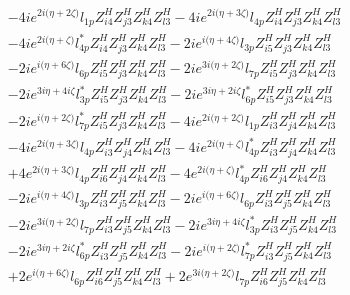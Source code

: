 \begin{align}
 &-4 i e^{2 i \Big(\eta +2 \zeta \Big)} l_{1p} Z_{{i 4}}^{H} Z_{{j 3}}^{H} Z_{{k 4}}^{H} Z_{{l 3}}^{H} -4 i e^{2 i \Big(\eta +3 \zeta \Big)} l_{4p} Z_{{i 4}}^{H} Z_{{j 3}}^{H} Z_{{k 4}}^{H} Z_{{l 3}}^{H} \nonumber \\ 
 &-4 i e^{2 i \Big(\eta +\zeta \Big)} l_{4p}^* Z_{{i 4}}^{H} Z_{{j 3}}^{H} Z_{{k 4}}^{H} Z_{{l 3}}^{H} -2 i e^{i \Big(\eta +4 \zeta \Big)} l_{3p} Z_{{i 5}}^{H} Z_{{j 3}}^{H} Z_{{k 4}}^{H} Z_{{l 3}}^{H} \nonumber \\ 
 &-2 i e^{i \Big(\eta +6 \zeta \Big)} l_{6p} Z_{{i 5}}^{H} Z_{{j 3}}^{H} Z_{{k 4}}^{H} Z_{{l 3}}^{H} -2 i e^{3 i \Big(\eta +2 \zeta \Big)} l_{7p} Z_{{i 5}}^{H} Z_{{j 3}}^{H} Z_{{k 4}}^{H} Z_{{l 3}}^{H} \nonumber \\ 
 &-2 i e^{3 i \eta +4 i \zeta } l_{3p}^* Z_{{i 5}}^{H} Z_{{j 3}}^{H} Z_{{k 4}}^{H} Z_{{l 3}}^{H} -2 i e^{3 i \eta +2 i \zeta } l_{6p}^* Z_{{i 5}}^{H} Z_{{j 3}}^{H} Z_{{k 4}}^{H} Z_{{l 3}}^{H} \nonumber \\ 
 &-2 i e^{i \Big(\eta +2 \zeta \Big)} l_{7p}^* Z_{{i 5}}^{H} Z_{{j 3}}^{H} Z_{{k 4}}^{H} Z_{{l 3}}^{H} -4 i e^{2 i \Big(\eta +2 \zeta \Big)} l_{1p} Z_{{i 3}}^{H} Z_{{j 4}}^{H} Z_{{k 4}}^{H} Z_{{l 3}}^{H} \nonumber \\ 
 &-4 i e^{2 i \Big(\eta +3 \zeta \Big)} l_{4p} Z_{{i 3}}^{H} Z_{{j 4}}^{H} Z_{{k 4}}^{H} Z_{{l 3}}^{H} -4 i e^{2 i \Big(\eta +\zeta \Big)} l_{4p}^* Z_{{i 3}}^{H} Z_{{j 4}}^{H} Z_{{k 4}}^{H} Z_{{l 3}}^{H} \nonumber \\ 
 &+4 e^{2 i \Big(\eta +3 \zeta \Big)} l_{4p} Z_{{i 6}}^{H} Z_{{j 4}}^{H} Z_{{k 4}}^{H} Z_{{l 3}}^{H} -4 e^{2 i \Big(\eta +\zeta \Big)} l_{4p}^* Z_{{i 6}}^{H} Z_{{j 4}}^{H} Z_{{k 4}}^{H} Z_{{l 3}}^{H} \nonumber \\ 
 &-2 i e^{i \Big(\eta +4 \zeta \Big)} l_{3p} Z_{{i 3}}^{H} Z_{{j 5}}^{H} Z_{{k 4}}^{H} Z_{{l 3}}^{H} -2 i e^{i \Big(\eta +6 \zeta \Big)} l_{6p} Z_{{i 3}}^{H} Z_{{j 5}}^{H} Z_{{k 4}}^{H} Z_{{l 3}}^{H} \nonumber \\ 
 &-2 i e^{3 i \Big(\eta +2 \zeta \Big)} l_{7p} Z_{{i 3}}^{H} Z_{{j 5}}^{H} Z_{{k 4}}^{H} Z_{{l 3}}^{H} -2 i e^{3 i \eta +4 i \zeta } l_{3p}^* Z_{{i 3}}^{H} Z_{{j 5}}^{H} Z_{{k 4}}^{H} Z_{{l 3}}^{H} \nonumber \\ 
 &-2 i e^{3 i \eta +2 i \zeta } l_{6p}^* Z_{{i 3}}^{H} Z_{{j 5}}^{H} Z_{{k 4}}^{H} Z_{{l 3}}^{H} -2 i e^{i \Big(\eta +2 \zeta \Big)} l_{7p}^* Z_{{i 3}}^{H} Z_{{j 5}}^{H} Z_{{k 4}}^{H} Z_{{l 3}}^{H} \nonumber \\ 
 &+2 e^{i \Big(\eta +6 \zeta \Big)} l_{6p} Z_{{i 6}}^{H} Z_{{j 5}}^{H} Z_{{k 4}}^{H} Z_{{l 3}}^{H} +2 e^{3 i \Big(\eta +2 \zeta \Big)} l_{7p} Z_{{i 6}}^{H} Z_{{j 5}}^{H} Z_{{k 4}}^{H} Z_{{l 3}}^{H} \nonumber \\ 

\end{align}
